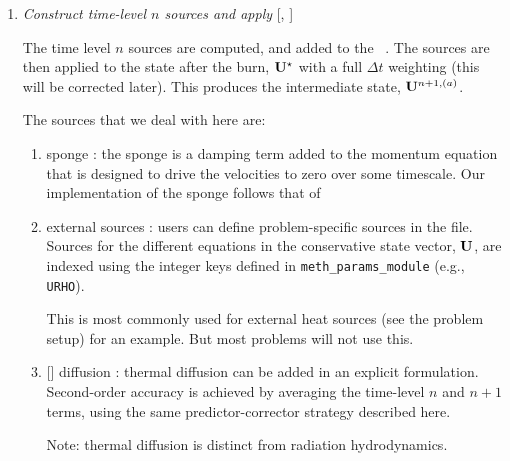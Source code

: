 \begin{enumerate}
  An experimental option (enabled via
  ) will create a custom
  distribution map based on the work needed in burning a zone and
  redistribute the boxes across processors before burning, to better
  load balance..  

  After reactions,  is called.

  At the end of this step,  sees the effects of the
  reactions.


\item \label{strang:oldsource} {\em Construct time-level $n$ sources and apply} 
  [, ]

  The time level $n$ sources are computed, and added to the
  \statedata\ .  The sources are then applied
  to the state after the burn, ${\bf U}^\star$ with a full $\Delta t$
  weighting (this will be corrected later).  This produces the
  intermediate state, ${\bf U}^{n+1,(a)}$.

  The sources that we deal with here are:
  \begin{enumerate}
  \item sponge : the sponge is a damping term added to
    the momentum equation that is designed to drive the velocities to
    zero over some timescale.  Our implementation of the sponge
    follows that of \maestro~\cite{maestro:III}

  \item external sources : users can define problem-specific sources
    in the  file.  Sources for the different
    equations in the conservative state vector, ${\bf U}$, are indexed
    using the integer keys defined in {\tt meth\_params\_module}
    (e.g., {\tt URHO}).

    This is most commonly used for external heat sources (see the
     problem setup) for an example.  But most
    problems will not use this.

  \item {[]} diffusion : thermal diffusion can be
    added in an explicit formulation.  Second-order accuracy is
    achieved by averaging the time-level $n$ and $n+1$ terms, using
    the same predictor-corrector strategy described here.

    Note: thermal diffusion is distinct from radiation hydrodynamics.


\end{enumerate}
\end{enumerate}
